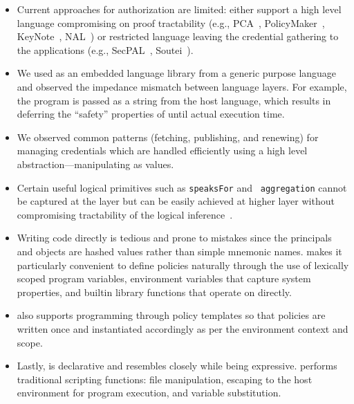 \begin{itemize}

\item Current approaches for authorization are limited: either support a high
level language compromising on proof tractability (e.g.,
PCA~\cite{appel99:proof-carrying}, PolicyMaker~\cite{blaze96:trust},
KeyNote~\cite{blaze03:keynote}, NAL~\cite{schneider11:nal}) or restricted
language leaving the credential gathering to the applications (e.g.,
SecPAL~\cite{Becker10:secpal}, Soutei~\cite{Pimlott06:soutei}).

\item We used  as an embedded language library from a generic
purpose language and observed the impedance mismatch between language layers.
For example, the  program is passed as a string from the host
language, which results in deferring the ``safety'' properties of
 until actual execution time.

\item We observed common patterns (fetching, publishing, and renewing) for
managing credentials which are handled efficiently using a high level
abstraction---manipulating  as values.

\item Certain useful logical primitives such as {\tt speaksFor} and {\tt
aggregation} cannot be captured at the  layer but can be easily
achieved at higher layer without compromising tractability of the logical
inference~\cite{Grohe:2010}.

\item Writing  code directly is tedious and prone to mistakes
since the principals and objects are hashed values rather than simple mnemonic
names.  makes it particularly convenient to define policies
naturally through the use of lexically scoped program variables, environment
variables that capture system properties, and builtin library functions that
operate on  directly.

\item {} also supports programming through policy templates so
that policies are written once and instantiated accordingly as per the
environment context and scope.

\item Lastly,  is declarative and resembles  closely while
being expressive.  performs traditional scripting functions: file
manipulation, escaping to the host environment for program execution, and
variable substitution.
\end{itemize}

